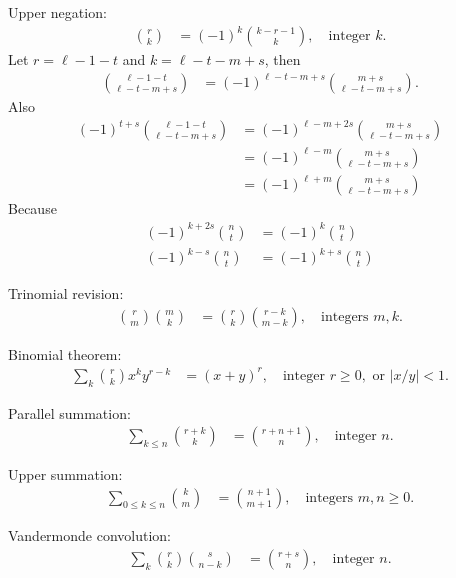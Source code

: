 \begin{identity}
    Upper negation:
    \begin{align*}
        \binom{r}{k} &= (-1)^k \binom{k - r - 1}{k}, \quad \text{integer } k.
    \end{align*}
    Let $r=\ell-1-t$ and $k=\ell-t-m+s$, then
    \begin{align*}
        \binom{\ell-1-t}{\ell-t-m+s} &= (-1)^{\ell-t-m+s} \binom{m+s}{\ell-t-m+s}.
    \end{align*}
    Also
    \begin{align*}
    (-1)
        ^{t+s} \binom{\ell-1-t}{\ell-t-m+s}
        &= (-1)^{\ell-m+2s} \binom{m+s}{\ell-t-m+s} \\
        &= (-1)^{\ell-m} \binom{m+s}{\ell-t-m+s} \\
        &= (-1)^{\ell+m} \binom{m+s}{\ell-t-m+s}
    \end{align*}
    Because
    \begin{align*}
    (-1)
        ^{k+2s} \binom{n}{t} &= (-1)^k \binom{n}{t} \\
        (-1)^{k-s} \binom{n}{t}  &= (-1)^{k+s} \binom{n}{t}
    \end{align*}
\end{identity}

\begin{identity}
    Trinomial revision:
    \begin{align*}
        \binom{r}{m} \binom{m}{k} &= \binom{r}{k} \binom{r - k}{m - k}, \quad \text{integers } m, k.
    \end{align*}
\end{identity}

\begin{identity}
    Binomial theorem:
    \begin{align*}
        \sum_{k} \binom{r}{k} x^k y^{r-k} &= (x + y)^r, \quad \text{integer } r \geq 0, \text{ or } |x/y| < 1.
    \end{align*}
\end{identity}

\begin{identity}
    Parallel summation:
    \begin{align*}
        \sum_{k \leq n} \binom{r + k}{k} &= \binom{r + n + 1}{n}, \quad \text{integer } n.
    \end{align*}
\end{identity}

\begin{identity}
    Upper summation:
    \begin{align*}
        \sum_{0 \leq k \leq n} \binom{k}{m} &= \binom{n + 1}{m + 1}, \quad \text{integers } m, n \geq 0.
    \end{align*}
\end{identity}

\begin{identity}
    Vandermonde convolution:
    \begin{align*}
        \sum_{k} \binom{r}{k} \binom{s}{n-k} &= \binom{r + s}{n}, \quad \text{integer } n.
    \end{align*}
\end{identity}




\clearpage
